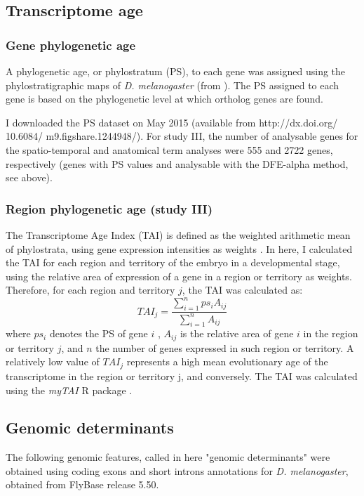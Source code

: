 \subsection{Transcriptome age}

\subsubsection{Gene phylogenetic age}
A phylogenetic age, or phylostratum (PS), to each gene was assigned using the phylostratigraphic maps of \textit{D. melanogaster} (from \citealp{Drost2014,Drost2015}). The PS assigned to each gene is based on the phylogenetic level at which ortholog genes are found. 

I downloaded the PS dataset on May 2015 (available from http://dx.doi.org/ 10.6084/ m9.figshare.1244948/). For study III, the number of analysable genes for the spatio-temporal and anatomical term analyses were 555 and 2722 genes, respectively (genes with PS values and analysable with the DFE-alpha method, see above).


\subsubsection{Region phylogenetic age (study III)} 

The Transcriptome Age Index (TAI) is defined as the weighted arithmetic mean of phylostrata, using gene expression intensities as weights \citep{Domazet-Loso2010}.
%
In here, I calculated the TAI for each region and territory of the embryo in a developmental stage, using the relative area of expression of a gene in a region or territory as weights.
Therefore, for each region and territory $j$, the TAI was calculated as:
%
$$ TAI_{j} = \frac{ \sum_{i=1}^{n} ps_{i}A_{ij} }{ \sum_{i=1}^{n} A_{ij} }$$
%
where $ps_{i}$ denotes the PS of gene $i$ , $A_{ij}$ is the relative area of gene $i$ in the region or territory $j$, and $n$ the number of genes expressed in such region or territory. A relatively low value of $TAI_{j}$ represents a high mean evolutionary age of the transcriptome in the region or territory j, and conversely. The TAI was calculated using the \textit{myTAI} R package \citep{Drost2014}.

\subsection{Genomic determinants}

The following genomic features, called in here "genomic determinants" were obtained using coding exons and short introns annotations for \textit{D. melanogaster}, obtained from FlyBase release 5.50. 

